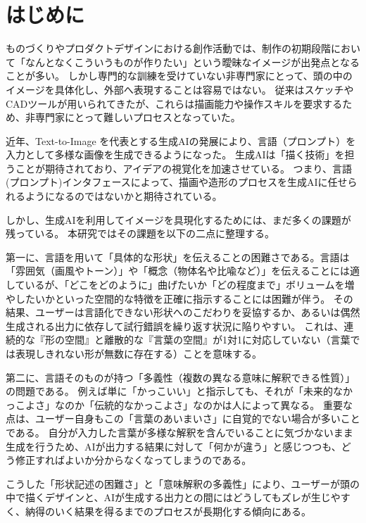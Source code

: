 \documentclass{kuisthesis}
\begin{document}
\section{はじめに}
ものづくりやプロダクトデザインにおける創作活動では、制作の初期段階において「なんとなくこういうものが作りたい」という曖昧なイメージが出発点となることが多い。
しかし専門的な訓練を受けていない非専門家にとって、頭の中のイメージを具体化し、外部へ表現することは容易ではない。
従来はスケッチやCADツールが用いられてきたが、これらは描画能力や操作スキルを要求するため、非専門家にとって難しいプロセスとなっていた。

近年、Text-to-Image を代表とする生成AIの発展により、言語（プロンプト）を入力として多様な画像を生成できるようになった。
生成AIは「描く技術」を担うことが期待されており、アイデアの視覚化を加速させている。
つまり、言語(プロンプト)インタフェースによって、描画や造形のプロセスを生成AIに任せられるようになるのではないかと期待されている。

しかし、生成AIを利用してイメージを具現化するためには、まだ多くの課題が残っている。
本研究ではその課題を以下の二点に整理する。

第一に、言語を用いて「具体的な形状」を伝えることの困難さである。言語は「雰囲気（画風やトーン）」や「概念（物体名や比喩など）」を伝えることには適しているが、「どこをどのように」曲げたいか「どの程度まで」ボリュームを増やしたいかといった空間的な特徴を正確に指示することには困難が伴う。
その結果、ユーザーは言語化できない形状へのこだわりを妥協するか、あるいは偶然生成される出力に依存して試行錯誤を繰り返す状況に陥りやすい。
これは、連続的な『形の空間』と離散的な『言葉の空間』が1対1に対応していない（言葉では表現しきれない形が無数に存在する）ことを意味する。

第二に、言語そのものが持つ「多義性（複数の異なる意味に解釈できる性質）」の問題である。
例えば単に「かっこいい」と指示しても、それが「未来的なかっこよさ」なのか「伝統的なかっこよさ」なのかは人によって異なる。 
重要な点は、ユーザー自身もこの「言葉のあいまいさ」に自覚的でない場合が多いことである。 
自分が入力した言葉が多様な解釈を含んでいることに気づかないまま生成を行うため、AIが出力する結果に対して「何かが違う」と感じつつも、どう修正すればよいか分からなくなってしまうのである。

こうした「形状記述の困難さ」と「意味解釈の多義性」により、ユーザーが頭の中で描くデザインと、AIが生成する出力との間にはどうしてもズレが生じやすく、納得のいく結果を得るまでのプロセスが長期化する傾向にある。
\end{document}
